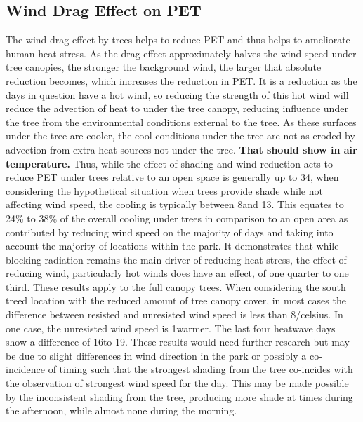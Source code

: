 \documentclass[twocolumn, a4paper]{article}
\providecommand{\comment}[1]{{\large\bf #1}}
\begin{document}
\subsection{Wind Drag Effect on PET}
The wind drag effect by trees helps to reduce PET and thus helps to ameliorate human heat stress. As the drag effect approximately halves the wind speed under tree canopies, the stronger the background wind, the larger that absolute reduction becomes, which increases the reduction in PET. It is a reduction as the days in question have a hot wind, so reducing the strength of this hot wind will reduce the advection of heat to under the tree canopy, reducing influence under the tree from the environmental conditions external to the tree. As these surfaces under the tree are cooler, the cool conditions under the tree are not as eroded by advection from extra heat sources not under the tree. \comment{That should show in air temperature.}
Thus, while the effect of shading and wind reduction acts to reduce PET under trees relative to an open space is generally up to 34\celsius, when considering the hypothetical situation when trees provide shade while not affecting wind speed, the cooling is typically between 8\celsius and 13\celsius. This equates to 24\% to 38\% of the overall cooling under trees in comparison to an open area as contributed by reducing wind speed on the majority of days and taking into account the majority of locations within the park. It demonstrates that while blocking radiation remains the main driver of reducing heat stress, the effect of reducing wind, particularly hot winds does have an effect, of one quarter to one third. These results apply to the full canopy trees.
When considering the south treed location with the reduced amount of tree canopy cover, in most cases the difference between resisted and unresisted wind speed is less than 8/celsius. In one case, the unresisted wind speed is 1\celsius warmer. The last four heatwave days show a difference of 16\celsius to 19\celsius. These results would need further research but may be due to slight differences in wind direction in the park or possibly a co-incidence of timing such that the strongest shading from the tree co-incides with the observation of strongest wind speed for the day. This may be made possible by the inconsistent shading from the tree, producing more shade at times during the afternoon, while almost none during the morning.
\end{document}
